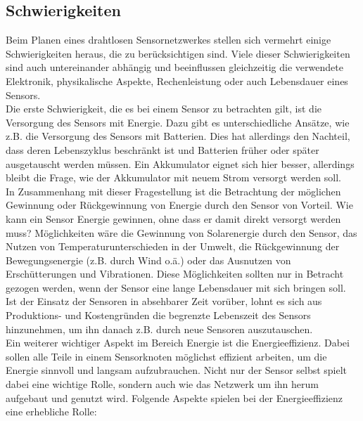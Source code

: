 \subsection{Schwierigkeiten}\label{ss:Schwierigkeiten}

Beim Planen eines drahtlosen Sensornetzwerkes stellen sich vermehrt einige Schwierigkeiten heraus, die zu berücksichtigen sind. Viele dieser Schwierigkeiten sind auch untereinander abhängig und beeinflussen gleichzeitig die verwendete Elektronik, physikalische Aspekte, Rechenleistung oder auch Lebensdauer eines Sensors.\\

Die erste Schwierigkeit, die es bei einem Sensor zu betrachten gilt, ist die Versorgung des Sensors mit Energie. Dazu gibt es unterschiedliche Ansätze, wie z.B. die Versorgung des Sensors mit Batterien. Dies hat allerdings den Nachteil, dass deren Lebenszyklus beschränkt ist und Batterien früher oder später ausgetauscht werden müssen. Ein Akkumulator eignet sich hier besser, allerdings bleibt die Frage, wie der Akkumulator mit neuem Strom versorgt werden soll.\\

In Zusammenhang mit dieser Fragestellung ist die Betrachtung der möglichen Gewinnung oder Rückgewinnung von Energie durch den Sensor von Vorteil. Wie kann ein Sensor Energie gewinnen, ohne dass er damit direkt versorgt werden muss? Möglichkeiten wäre die Gewinnung von Solarenergie durch den Sensor, das Nutzen von Temperaturunterschieden in der Umwelt, die Rückgewinnung der Bewegungsenergie (z.B. durch Wind o.ä.) oder das Ausnutzen von Erschütterungen und Vibrationen. Diese Möglichkeiten sollten nur in Betracht gezogen werden, wenn der Sensor eine lange Lebensdauer mit sich bringen soll. Ist der Einsatz der Sensoren in absehbarer Zeit vorüber, lohnt es sich aus Produktions- und Kostengründen die begrenzte Lebenszeit des Sensors hinzunehmen, um ihn danach z.B. durch neue Sensoren auszutauschen.\\

Ein weiterer wichtiger Aspekt im Bereich Energie ist die Energieeffizienz. Dabei sollen alle Teile in einem Sensorknoten möglichst effizient arbeiten, um die Energie sinnvoll und langsam aufzubrauchen. Nicht nur der Sensor selbst spielt dabei eine wichtige Rolle, sondern auch wie das Netzwerk um ihn herum aufgebaut und genutzt wird. Folgende Aspekte spielen bei der Energieeffizienz eine erhebliche Rolle:

